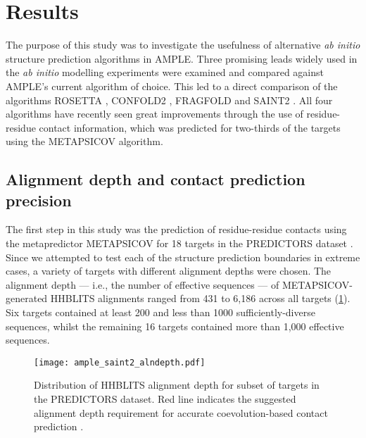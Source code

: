 \section{Results}
The purpose of this study was to investigate the usefulness of alternative \textit{ab initio} structure prediction algorithms in AMPLE. Three promising leads widely used in the \textit{ab initio} modelling experiments were examined and compared against AMPLE's current algorithm of choice. This led to a direct comparison of the algorithms ROSETTA \cite{Rohl2004-dj}, CONFOLD2 \cite{Adhikari2018-lj}, FRAGFOLD \cite{Jones2001-mc} and SAINT2 \cite{De_Oliveira2018-sg}. All four algorithms have recently seen great improvements through the use of residue-residue contact information, which was predicted for two-thirds of the targets using the METAPSICOV \cite{Jones2015-vq} algorithm.

\subsection{Alignment depth and contact prediction precision}
The first step in this study was the prediction of residue-residue contacts using the metapredictor METAPSICOV for 18 targets in the PREDICTORS dataset \cite{Jones2015-vq}. Since we attempted to test each of the structure prediction boundaries in extreme cases, a variety of targets with different alignment depths were chosen. The alignment depth --- i.e., the number of effective sequences --- of METAPSICOV-generated HHBLITS alignments ranged from 431 to 6,186 across all targets (\cref{fig:ample_saint2_alndepth}). Six targets contained at least 200 and less than 1000 sufficiently-diverse sequences, whilst the remaining 16 targets contained more than 1,000 effective sequences.

\begin{figure}[H]
    \centering
    \texttt{[image: ample\_saint2\_alndepth.pdf]}
    \caption[Alignment depth for subsets of targets in the PREDICTORS dataset]{Distribution of HHBLITS alignment depth for subset of targets in the PREDICTORS dataset. Red line indicates the suggested alignment depth requirement for accurate coevolution-based contact prediction \cite{Simkovic2017-xs}.}
    \label{fig:ample_saint2_alndepth}
\end{figure}

